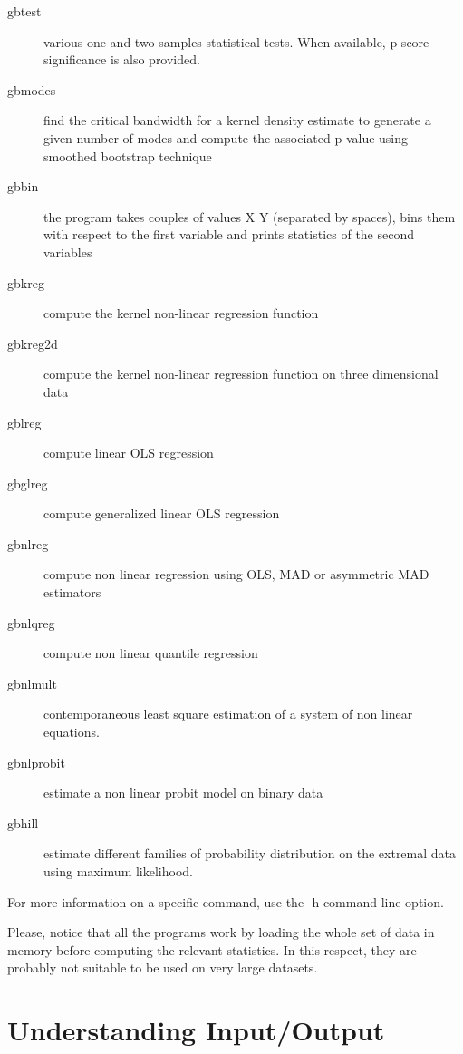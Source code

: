 \documentclass[11pt]{article}
\begin{document}
\begin{description}
\item[{gbtest}] various one and two samples statistical tests. When
available, p-score significance is also provided.

\item[{gbmodes}] find the critical bandwidth for a kernel density estimate
to generate a given number of modes and compute the
associated p-value using smoothed bootstrap technique

\item[{gbbin}] the program takes couples of values X Y (separated by
spaces), bins them with respect to the first variable and
prints statistics of the second variables

\item[{gbkreg}] compute the kernel non-linear regression function

\item[{gbkreg2d}] compute the kernel non-linear regression function on
three dimensional data

\item[{gblreg}] compute linear OLS regression

\item[{gbglreg}] compute generalized linear OLS regression

\item[{gbnlreg}] compute non linear regression using OLS, MAD or
asymmetric MAD estimators

\item[{gbnlqreg}] compute non linear quantile regression

\item[{gbnlmult}] contemporaneous least square estimation of a system of
non linear equations.

\item[{gbnlprobit}] estimate a non linear probit model on binary data

\item[{gbhill}] estimate different families of probability distribution on
the extremal data using maximum likelihood.
\end{description}


For more information on a specific command, use the -h command line
option.

Please, notice that all the programs work by loading the whole set of
data in memory before computing the relevant statistics. In this
respect, they are probably not suitable to be used on very large
datasets.
\section{Understanding Input/Output}
\label{sec-2}
\end{document}
